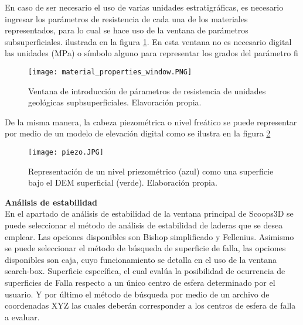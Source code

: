 En caso de ser necesario el uso de varias unidades estratigr\'{a}ficas, es necesario ingresar
los par\'{a}metros de resistencia de cada una de los materiales representados, para lo cual se
hace uso de la ventana de par\'{a}metros subsuperficiales. ilustrada en la figura \ref{fig:parameters}. En esta ventana no es necesario  digital las unidades (MPa) o s\'imbolo alguno para representar los grados del par\'ametro  fi \\

\begin{figure}[H]
\centering
\texttt{[image: material\_properties\_window.PNG]}
\caption{Ventana de introducci\'on de p\'arametros de resistencia de unidades geol\'ogicas supbsuperficiales. Elavoraci\'on propia.}
\label{fig:parameters}
\end{figure}


De la misma manera, la cabeza piezom\'{e}trica o nivel fre\'{a}tico se puede representar por
medio de un modelo de elevaci\'{o}n digital como se ilustra en la figura \ref{modelo piezometrico}
\\


\begin{figure}[H]
\centering
\texttt{[image: piezo.JPG]}
\caption{Representaci\'on de un nivel priezom\'etrico (azul) como una superficie bajo el DEM superficial (verde). Elaboraci\'on propia.}
\label{modelo piezometrico}
\end{figure}

\textbf{An\'{a}lisis de estabilidad}\\
En el apartado de an\'{a}lisis de estabilidad de la ventana principal de Scoops3D se puede
seleccionar el m\'{e}todo de an\'{a}lisis de estabilidad de laderas que se desea emplear. Las
opciones disponibles son Bishop simplificado y Fellenius.
Asimismo se puede seleccionar el m\'{e}todo de b\'{u}squeda de superficie de falla, las opciones
disponibles son caja, cuyo funcionamiento se detalla en el uso de la ventana search-box.
Superficie espec\'{i}fica, el cual eval\'{u}a la posibilidad de ocurrencia de superficies de Falla
respecto a un \'{u}nico centro de esfera determinado por el usuario. Y por \'{u}ltimo el m\'{e}todo de
b\'usqueda por medio de un archivo de coordenadas XYZ las cuales deber\'an corresponder a
los centros de esfera de falla a evaluar.\par

